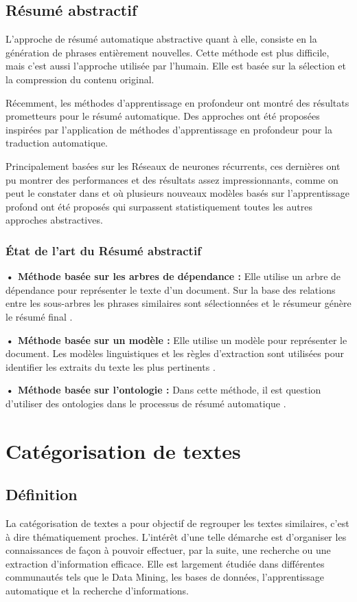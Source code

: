     \subsection{Résumé abstractif}
        L'approche de résumé automatique abstractive quant à elle, consiste en la génération de phrases entièrement nouvelles. Cette méthode est plus difficile, mais c'est aussi l'approche utilisée par l'humain. Elle est basée sur la sélection et la compression du contenu original.

        Récemment, les méthodes d'apprentissage en profondeur ont montré des résultats prometteurs pour le résumé automatique. Des approches ont été proposées inspirées par l'application de méthodes d'apprentissage en profondeur pour la traduction automatique.

        Principalement basées sur les Réseaux de neurones récurrents, ces dernières ont pu montrer des performances et des résultats assez impressionnants, comme on peut le constater dans \cite{atsuss} et \cite{ruch} où plusieurs nouveaux modèles basés sur l'apprentissage profond ont été proposés qui surpassent statistiquement toutes les autres approches abstractives.

        \subsubsection{État de l'art du Résumé abstractif}
        \textbf{• Méthode basée sur les arbres de dépendance :} Elle utilise un arbre de dépendance pour représenter le texte d'un document. Sur la base des relations entre les sous-arbres les phrases similaires sont sélectionnées et le résumeur génère le résumé final \cite{5}.
            
        \textbf{• Méthode basée sur un modèle :} Elle utilise un modèle pour représenter le document. Les modèles linguistiques et les règles d'extraction sont utilisées pour identifier les extraits du texte les plus pertinents \cite{5}.

        \textbf{• Méthode basée sur l'ontologie :} Dans cette méthode, il est question d'utiliser des ontologies dans le processus de résumé automatique \cite{ram}.
 
        

\section{Catégorisation de textes}
    \subsection{Définition}
    La catégorisation de textes a pour objectif de regrouper les textes similaires, c'est à dire thématiquement proches. L'intérêt d'une telle démarche est d'organiser les connaissances de façon à pouvoir effectuer, par la suite, une recherche ou une extraction d'information efficace. Elle est largement étudiée dans différentes communautés tels que le Data Mining, les bases de données, l'apprentissage automatique et la recherche d'informations.


